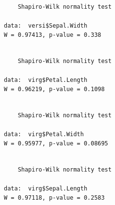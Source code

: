 \documentclass[
  letterpaper,
  DIV=11,
  numbers=noendperiod]{scrartcl}
\newenvironment{Shaded}{\begin{snugshade}}{\end{snugshade}}
\newcommand{\CommentTok}[1]{\textcolor[rgb]{0.37,0.37,0.37}{#1}}
\newcommand{\FunctionTok}[1]{\textcolor[rgb]{0.28,0.35,0.67}{#1}}
\newcommand{\NormalTok}[1]{\textcolor[rgb]{0.00,0.23,0.31}{#1}}
\newcommand{\SpecialCharTok}[1]{\textcolor[rgb]{0.37,0.37,0.37}{#1}}
\begin{document}
\begin{verbatim}

    Shapiro-Wilk normality test

data:  versi$Sepal.Width
W = 0.97413, p-value = 0.338
\end{verbatim}

\begin{Shaded}
\end{Shaded}

\begin{verbatim}

    Shapiro-Wilk normality test

data:  virg$Petal.Length
W = 0.96219, p-value = 0.1098
\end{verbatim}

\begin{Shaded}
\end{Shaded}

\begin{verbatim}

    Shapiro-Wilk normality test

data:  virg$Petal.Width
W = 0.95977, p-value = 0.08695
\end{verbatim}

\begin{Shaded}
\end{Shaded}

\begin{verbatim}

    Shapiro-Wilk normality test

data:  virg$Sepal.Length
W = 0.97118, p-value = 0.2583
\end{verbatim}

\begin{Shaded}
\end{Shaded}
\end{document}
